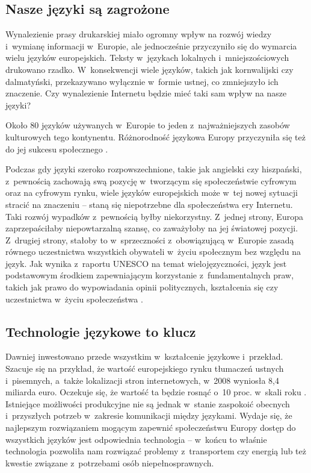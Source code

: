 \begin{multicols}{2}
\subsection{Nasze języki są zagrożone} 

Wynalezienie prasy drukarskiej miało ogromny wpływ na rozwój wiedzy
i~wymianę informacji w~Europie, ale jednocześnie przyczyniło się
do wymarcia wielu języków europejskich. Teksty w~językach lokalnych
i~mniejszościowych drukowano rzadko. W~konsekwencji wiele języków,
takich jak kornwalijski czy dalmatyński, przekazywano wyłącznie
w~formie ustnej, co zmniejszyło ich znaczenie. Czy wynalezienie
Internetu będzie mieć taki sam wpływ na nasze języki? 

Około 80 języków używanych w~Europie to jeden z~najważniejszych
zasobów kulturowych tego kontynentu. Różnorodność językowa
Europy przyczyniła się też do jej sukcesu społecznego \cite{EC2}.


Podczas gdy języki szeroko rozpowszechnione, takie jak angielski czy
hiszpański, z~pewnością zachowają swą pozycję w~tworzącym się
społeczeństwie cyfrowym oraz na cyfrowym rynku, wiele języków
europejskich może w~tej nowej sytuacji stracić na znaczeniu –
staną się niepotrzebne dla społeczeństwa ery Internetu. Taki
rozwój wypadków z~pewnością byłby niekorzystny. Z~jednej strony,
Europa zaprzepaściłaby niepowtarzalną szansę, co zaważyłoby na
jej światowej pozycji. Z~drugiej strony, stałoby to w~sprzeczności
z~obowiązującą w~Europie zasadą równego uczestnictwa wszystkich
obywateli w~życiu społecznym bez względu na język. Jak wynika
z~raportu UNESCO na temat wielojęzyczności, język jest podstawowym
środkiem zapewniającym korzystanie z~fundamentalnych praw, takich
jak prawo do wypowiadania opinii politycznych, kształcenia się czy
uczestnictwa w~życiu społeczeństwa \cite{Unesco1}. 

\subsection{Technologie językowe to klucz} 

Dawniej inwestowano przede wszystkim w~kształcenie językowe
i~przekład. Szacuje się na przykład, że wartość europejskiego
rynku tłumaczeń ustnych i~pisemnych, a~także lokalizacji stron
internetowych, w~2008 wyniosła 8,4 miliarda euro. Oczekuje się, że
wartość ta będzie rosnąć o~10 proc. w~skali roku \cite{EC3}.
Istniejące możliwości produkcyjne nie są jednak w~stanie
zaspokoić obecnych i~przyszłych potrzeb w~zakresie komunikacji
między językami. Wydaje się, że najlepszym rozwiązaniem mogącym
zapewnić społeczeństwu Europy dostęp do wszystkich języków jest
odpowiednia technologia – w~końcu to właśnie technologia
pozwoliła nam rozwiązać problemy z~transportem czy energią lub
też kwestie związane z~potrzebami osób niepełnosprawnych.


\end{multicols}
